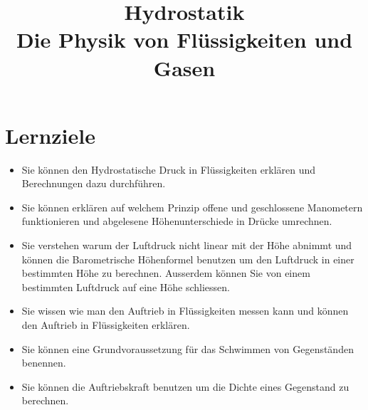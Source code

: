 \documentclass[12pt,a4paper,twoside]{article}
\date{}
\title{Hydrostatik\\{\large Die Physik von Flüssigkeiten und Gasen}}
\begin{document}
\maketitle


\section*{Lernziele}

\begin{itemize}
	\item Sie können den Hydrostatische Druck in Flüssigkeiten erklären und Berechnungen dazu durchführen.
	\item Sie können erklären auf welchem Prinzip offene und geschlossene Manometern funktionieren und abgelesene Höhenunterschiede in Drücke umrechnen.
	\item Sie verstehen warum der Luftdruck nicht linear mit der Höhe abnimmt 
		und können die Barometrische Höhenformel benutzen um den Luftdruck in 
		einer bestimmten Höhe zu berechnen. Ausserdem können Sie von einem bestimmten Luftdruck auf eine Höhe schliessen.
	\item Sie wissen wie man den Auftrieb in Flüssigkeiten messen kann und können den Auftrieb in Flüssigkeiten erklären.
	\item Sie können eine Grundvoraussetzung für das Schwimmen von Gegenständen benennen.
	\item Sie können die Auftriebskraft benutzen um die Dichte eines Gegenstand zu berechnen.
\end{itemize}
\end{document}
